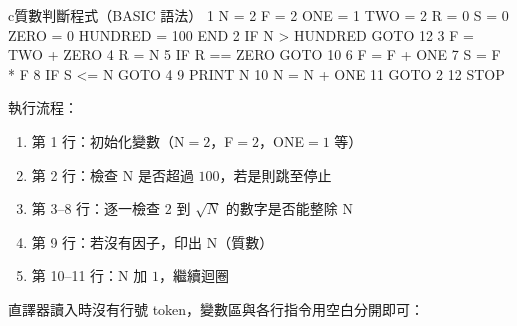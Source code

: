 \begin{code}{c}{質數判斷程式（BASIC 語法）}
1 N = 2 F = 2 ONE = 1 TWO = 2 R = 0 S = 0 ZERO = 0 HUNDRED = 100 END
2 IF N > HUNDRED GOTO 12
3 F = TWO + ZERO
4 R = N %
5 IF R == ZERO GOTO 10
6 F = F + ONE
7 S = F * F
8 IF S <= N GOTO 4
9 PRINT N
10 N = N + ONE
11 GOTO 2
12 STOP
\end{code}

執行流程：
\begin{enumerate}
\item 第 1 行：初始化變數（N$=2$，F$=2$，ONE$=1$ 等）
\item 第 2 行：檢查 N 是否超過 $100$，若是則跳至停止
\item 第 3--8 行：逐一檢查 $2$ 到 $\sqrt{N}$ 的數字是否能整除 N
\item 第 9 行：若沒有因子，印出 N（質數）
\item 第 10--11 行：N 加 $1$，繼續迴圈
\end{enumerate}

直譯器讀入時沒有行號 token，變數區與各行指令用空白分開即可：


